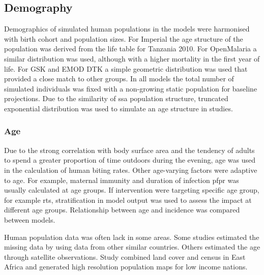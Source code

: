 \documentclass[a4paper, 12pt, twoside]{article}
\begin{document}
\subsection{Demography}
Demographics of simulated human populations in the models were harmonised with birth cohort and population sizes.
For Imperial the age structure of the population was derived from the life table for Tanzania 2010.
For OpenMalaria a similar distribution was used, although with a higher mortality in the first year of life.
For GSK and EMOD DTK a simple geometric distribution was used that provided a close match to other groups.
In all models the total number of simulated individuals was fixed with a non-growing static population for baseline projections.
Due to the similarity of \gls{ssa} population structure, truncated exponential distribution was used to simulate an age structure in studies\cite{White2018b}.

\subsubsection{Age}
Due to the strong correlation with body surface area and the tendency of adults to spend a greater proportion of time outdoors during the evening, age was used in the calculation of human biting rates.
Other age-varying factors were adaptive to age. For example, maternal immunity and duration of infection \gls{pfpr} was usually calculated at age groups.
If intervention were targeting specific age group, for example \gls{rts}, stratification in model output was used to assess the impact at different age groups.
Relationship between age and incidence was compared between models.

Human population data was often lack in some areas.
Some studies estimated the missing data by using data from other similar countries.
Others estimated the age through satellite observations.
Study combined land cover and census in East Africa and generated high resolution population maps for low income nations.
\end{document}
